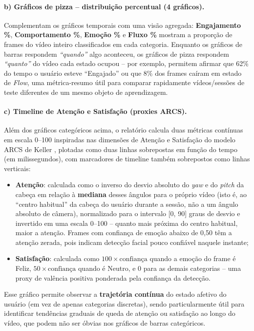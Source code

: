 \documentclass[
	12pt,
	openright,
	oneside,
	a4paper,
	english,
	brazil
	]{abntex2}
\begin{document}
\paragraph{b) Gráficos de pizza -- distribuição percentual (4 gráficos).}
Complementam os gráficos temporais com uma visão agregada: \textbf{Engajamento \%}, \textbf{Comportamento \%}, \textbf{Emoção \%} e \textbf{Fluxo \%} mostram a proporção de frames do vídeo inteiro classificados em cada categoria. Enquanto os gráficos de barras respondem \textit{``quando''} algo aconteceu, os gráficos de pizza respondem \textit{``quanto''} do vídeo cada estado ocupou -- por exemplo, permitem afirmar que 62\% do tempo o usuário esteve ``Engajado'' ou que 8\% dos frames caíram em estado de \textit{Flow}, uma métrica-resumo útil para comparar rapidamente vídeos/sessões de teste diferentes de um mesmo objeto de aprendizagem.

\paragraph{c) Timeline de Atenção e Satisfação (proxies ARCS).}
Além dos gráficos categóricos acima, o relatório calcula duas métricas contínuas em escala 0--100 inspiradas nas dimensões de Atenção e Satisfação do modelo ARCS de Keller \cite{keller1987arcs}, plotadas como duas linhas sobrepostas em função do tempo (em milissegundos), com marcadores de timeline também sobrepostos como linhas verticais:
\begin{itemize}
    \item \textbf{Atenção}: calculada como o inverso do desvio absoluto do \textit{yaw} e do \textit{pitch} da cabeça em relação à \textbf{mediana} desses ângulos para o próprio vídeo (isto é, ao ``centro habitual'' da cabeça do usuário durante a sessão, não a um ângulo absoluto de câmera), normalizado para o intervalo [0, 90] graus de desvio e invertido em uma escala 0--100 -- quanto mais próxima do centro habitual, maior a atenção. Frames com confiança de emoção abaixo de 0,50 têm a atenção zerada, pois indicam detecção facial pouco confiável naquele instante;
    \item \textbf{Satisfação}: calculada como $100 \times \text{confiança}$ quando a emoção do frame é Feliz, $50 \times \text{confiança}$ quando é Neutro, e 0 para as demais categorias -- uma proxy de valência positiva ponderada pela confiança da detecção.
\end{itemize}
Esse gráfico permite observar a \textbf{trajetória contínua} do estado afetivo do usuário (em vez de apenas categorias discretas), sendo particularmente útil para identificar tendências graduais de queda de atenção ou satisfação ao longo do vídeo, que podem não ser óbvias nos gráficos de barras categóricos.
\end{document}
